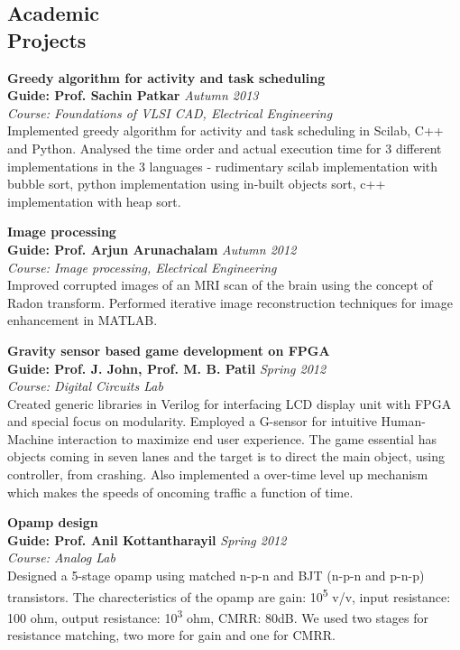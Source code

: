 \documentclass[margin,line]{resume}
\begin{document}
\begin{resume}
\section{\mysidestyle Academic \\ Projects}
	\vspace{0mm}
	
	{\bf Greedy algorithm for activity and task scheduling} \\
    {\bf Guide: Prof. Sachin Patkar} 	\hfill \textit{Autumn 2013} \\
    { \it Course: Foundations of VLSI CAD, Electrical Engineering}\\
	Implemented greedy algorithm for activity and task scheduling in Scilab, C++ and Python. Analysed the time order and actual execution time for 3 different implementations in the 3 languages - rudimentary scilab implementation with bubble sort, python implementation using in-built objects sort, c++ implementation with heap sort.
	
	{\bf Image processing} \\
    {\bf Guide: Prof. Arjun Arunachalam} 	\hfill \textit{Autumn 2012} \\
    { \it Course: Image processing, Electrical Engineering}\\
	Improved corrupted images of an MRI scan of the brain using the concept of Radon transform. Performed iterative image reconstruction techniques for image enhancement in MATLAB.
	
	{\bf Gravity sensor based game development on FPGA} \\
    {\bf Guide: Prof. J. John, Prof. M. B. Patil} 	\hfill \textit{Spring 2012} \\
    { \it Course: Digital Circuits Lab}\\
    Created generic libraries in Verilog for interfacing LCD display unit with FPGA and special focus on modularity. Employed a G-sensor for intuitive Human-Machine interaction to maximize end user experience. The game essential has objects coming in seven lanes and the target is to direct the main object, using controller, from crashing. Also implemented a over-time level up mechanism which makes the speeds of oncoming traffic a function of time.

	{\bf Opamp design} \\
    {\bf Guide: Prof. Anil Kottantharayil} 	\hfill \textit{Spring 2012} \\
    { \it Course: Analog Lab}\\
    Designed a 5-stage opamp using matched n-p-n and BJT (n-p-n and p-n-p) transistors. The charecteristics of the opamp are gain: 10\textsuperscript{5} v/v, input resistance: 100 ohm, output resistance: 10\textsuperscript{3} ohm, CMRR: 80dB. We used two stages for resistance matching, two more for gain and one for CMRR.
    

\end{resume}
\end{document}
